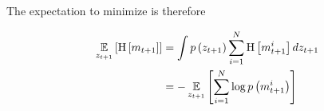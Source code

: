 The expectation to minimize is therefore

\begin{align} \begin{split}
    \expect_{z_{t+1}}\left[
        \text{H}\left[
            m_{t+1}
        \right]
    \right]
    &=
    \int
    p\left(
        z_{t+1}
    \right)
    \sum_{i=1}^{N}
    \text{H}\left[
        m_{t+1}^{i}
    \right]
    dz_{t+1}
    \\
    &=
    -\expect_{z_{t+1}}\left[
        \sum_{i=1}^{N}
        \log p\left(
            m_{t+1}^{i}
        \right)
    \right]
\end{split} \end{align}
